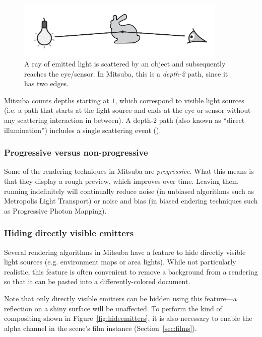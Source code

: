 \begin{figure}[h!]
\centering
\vspace{-5mm}
\includegraphics[width=10cm]{images/path_explanation.pdf}
\vspace{-5mm}
\caption{
	\label{fig:path-explanation}
	A ray of emitted light is scattered by an object and subsequently
	reaches the eye/sensor.
	In Mitsuba, this is a \emph{depth-2} path, since it has two edges.
}
\end{figure}
Mitsuba counts depths starting at $1$, which correspond to
visible light sources (i.e. a path that starts at the light
source and ends at the eye or sensor without any scattering
interaction in between).
A depth-$2$ path (also known as ``direct illumination'') includes
a single scattering event ().

\subsubsection*{Progressive versus non-progressive}
Some of the rendering techniques in Mitsuba are \emph{progressive}.
What this means is that they display a rough preview, which improves over time.
Leaving them running indefinitely will continually reduce noise (in unbiased algorithms
such as Metropolis Light Transport) or noise and bias (in biased
 endering techniques such as Progressive Photon Mapping).
\newpage
\subsubsection*{Hiding directly visible emitters}
\label{sec:hideemitters}
Several rendering algorithms in Mitsuba have a feature to hide directly
visible light sources (e.g. environment maps or area lights). While not
particularly realistic, this feature is often convenient to remove a background
from a rendering so that it can be pasted into a differently-colored document.

Note that only directly visible emitters can be hidden using this feature---a
reflection on a shiny surface will be unaffected. To perform the kind of
compositing shown in Figure~\ref{fig:hideemitters}, it is also necessary to
enable the alpha channel in the scene's film instance (Section~\ref{sec:films}).

